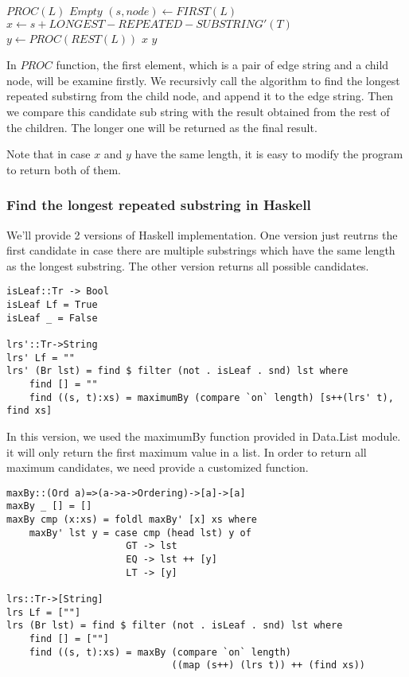 \documentclass{article}
\begin{document}
\begin{algorithmic}
\STATE $PROC(L)$
    \RETURN $Empty$
  \ELSE
    \STATE $(s, node) \leftarrow FIRST(L)$
    \STATE $x \leftarrow s + LONGEST-REPEATED-SUBSTRING'(T)$
    \STATE $y \leftarrow PROC(REST(L))$
      \RETURN $x$
    \ELSE
      \RETURN $y$
    \ENDIF
  \ENDIF
\end{algorithmic}

In $PROC$ function, the first element, which is a pair of edge string
and a child node, will be examine firstly. We recursivly call the 
algorithm to find the longest repeated substirng from the child node,
and append it to the edge string. Then we compare this candidate
sub string with the result obtained from the rest of the children.
The longer one will be returned as the final result.

Note that in case $x$ and $y$ have the same length, it is easy to
modify the program to return both of them.

\subsubsection*{Find the longest repeated substring in Haskell}
We'll provide 2 versions of Haskell implementation. One version
just reutrns the first candidate in case there are multiple substrings
which have the same length as the longest substring. The other
version returns all possible candidates.

\lstset{language=Haskell}
\begin{lstlisting}
isLeaf::Tr -> Bool
isLeaf Lf = True
isLeaf _ = False

lrs'::Tr->String
lrs' Lf = ""
lrs' (Br lst) = find $ filter (not . isLeaf . snd) lst where
    find [] = ""
    find ((s, t):xs) = maximumBy (compare `on` length) [s++(lrs' t), find xs]
\end{lstlisting} %

In this version, we used the maximumBy function provided in Data.List
module. it will only return the first maximum value in a list.
In order to return all maximum candidates, we need provide a customized
function.

\begin{lstlisting}
maxBy::(Ord a)=>(a->a->Ordering)->[a]->[a]
maxBy _ [] = []
maxBy cmp (x:xs) = foldl maxBy' [x] xs where
    maxBy' lst y = case cmp (head lst) y of
                     GT -> lst
                     EQ -> lst ++ [y]
                     LT -> [y]

lrs::Tr->[String]
lrs Lf = [""]
lrs (Br lst) = find $ filter (not . isLeaf . snd) lst where
    find [] = [""]
    find ((s, t):xs) = maxBy (compare `on` length) 
                             ((map (s++) (lrs t)) ++ (find xs))
\end{lstlisting} %
\end{document}
